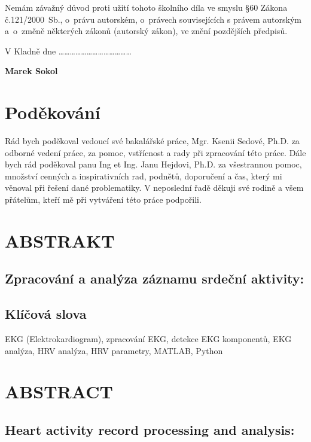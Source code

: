 \documentclass[a4paper,12pt]{article}   %
\numberwithin{equation}{section}        %
\newcommand{\autor}{Marek Sokol}
\newcommand{\nazev}{Zpracování a analýza záznamu srdeční aktivity}
\newcommand{\nazevENG}{Heart activity record processing and analysis}
\begin{document}
\hspace{-0.75cm}Nemám závažný důvod proti užití tohoto školního díla ve smyslu \S 60 Zákona č.121/2000~Sb., o~právu autorském, o~právech souvisejících s právem autorským a~o~změně některých zákonů (autorský zákon), ve znění pozdějších předpisů.

\vspace{1em}

\hspace{-0.75cm}V Kladně dne \ldots \ldots \ldots \hfill \ldots \ldots \ldots \ldots \ldots \ldots \ldots \ldots \ldots \ldots

\hspace{10cm} \textbf{\autor}

\clearpage

\null\vfill
\section*{Poděkování}
Rád bych poděkoval vedoucí své bakalářské práce, Mgr. Ksenii Sedové, Ph.D. za
odborné vedení práce, za pomoc, vstřícnost a rady při zpracování této práce.
Dále bych rád poděkoval panu Ing et Ing. Janu Hejdovi, Ph.D. za všestrannou
pomoc, množství cenných a inspirativních rad, podnětů, doporučení a čas, který
mi věnoval při řešení dané problematiky. V neposlední řadě děkuji své rodině a
všem přátelům, kteří mě při vytváření této práce podpořili.

\clearpage


\null\vfill
\section*{ABSTRAKT}
\subsection*{\nazev:}

\subsection*{Klíčová slova}
EKG (Elektrokardiogram), zpracování EKG, detekce EKG komponentů, EKG analýza, HRV analýza, HRV parametry, MATLAB, Python
\clearpage


\null\vfill
\section*{ABSTRACT}
\subsection*{\nazevENG:}

\end{document}
